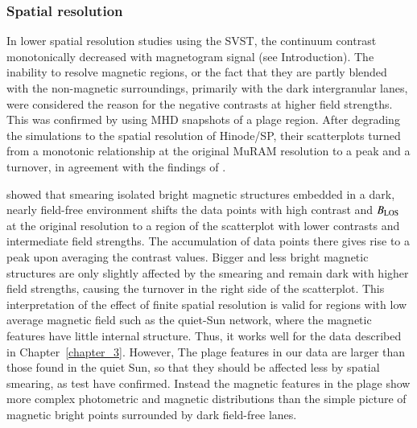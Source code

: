 \documentclass[goettingen, gauss, print]{thesis}
\begin{document}
\subsubsection{Spatial resolution}
\label{morphology}
In lower spatial resolution studies \citep[]{title_differences_1992,topka_properties_1992,lawrence_contrast_1993} using the SVST, the continuum contrast monotonically decreased with magnetogram signal (see Introduction). The inability to resolve magnetic regions, or the fact that they are partly blended with the non-magnetic surroundings, primarily with the dark intergranular lanes, were considered the reason for the negative contrasts at higher field strengths. 
This was confirmed by \cite{danilovic_relation_2013} using MHD snapshots of a plage region. After degrading the simulations to the spatial resolution of Hinode/SP, their scatterplots turned from a monotonic relationship at the original MuRAM resolution to a peak and a turnover, in agreement with the findings of \cite{kobel_continuum_2011}.

\cite{danilovic_relation_2013} showed that smearing isolated bright magnetic structures embedded in a dark, nearly field-free environment shifts the data points with high contrast and $B_{\rm LOS}$ at the original resolution to a region of the scatterplot with lower contrasts and intermediate field strengths. The accumulation of data points there gives rise to a peak upon averaging the contrast values. Bigger and less bright magnetic structures are only slightly affected by the smearing and remain dark with higher field strengths, causing the turnover in the right side of the scatterplot. 
This interpretation of the effect of finite spatial resolution is valid for regions with low average magnetic field such as the quiet-Sun network, where the magnetic features have little internal structure. Thus, it works well for the data described in Chapter~\ref{chapter_3}. However, The plage features in our data are larger than those found in the quiet Sun, so that they should be affected less by spatial smearing, as test have confirmed. Instead the magnetic features in the plage show more complex photometric and magnetic distributions than the simple picture of magnetic bright points surrounded by dark field-free lanes. 
\end{document}
